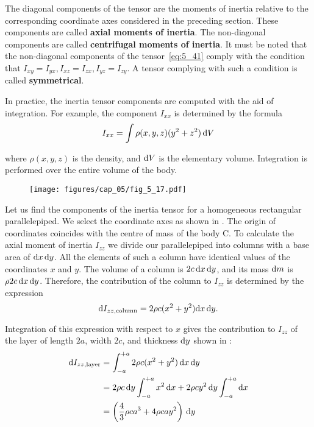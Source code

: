 \noindent
The diagonal components of the tensor are the moments of inertia relative to the corresponding coordinate axes considered in the preceding section. These components are called \textbf{axial moments of inertia}. The non-diagonal components are called \textbf{centrifugal moments of inertia}. It must be noted that the non-diagonal components of the tensor~\eqref{eq:5_41} comply with the condition that $I_{xy}=I_{yx}, I_{xz}=I_{zx}, I_{yz}=I_{zy}$. A tensor complying with such a condition is called \textbf{symmetrical}.

In practice, the inertia tensor components are computed with the aid of integration. For example, the component $I_{xx}$ is determined by the formula
\begin{equation*}
	I_{xx} = \int \rho(x,y,z)(y^2+z^2)\,\mathrm{d} V
\end{equation*}

\noindent
where $\rho(x,y,z)$ is the density, and $\mathrm{d} V$ is the elementary volume. Integration is performed over the entire volume of the body.

\begin{figure}[t]
	\begin{center}
		\texttt{[image: figures/cap\_05/fig\_5\_17.pdf]}
		\caption[]{}
		\label{fig:5_17}
	\end{center}
\vspace{-1.0cm}
\end{figure}

Let us find the components of the inertia tensor for a homogeneous rectangular parallelepiped. We select the coordinate axes as shown in . The origin of coordinates coincides with the centre of mass of the body C. To calculate the axial moment of inertia $I_{zz}$ we divide our parallelepiped into columns with a base area of $\mathrm{d} x\,\mathrm{d} y$. All the elements of such a column have identical values of the coordinates $x$ and $y$. The volume of a column is $2c\,\mathrm{d} x\,\mathrm{d} y$, and its mass $\mathrm{d} m$ is $\rho 2c\,\mathrm{d} x\,\mathrm{d} y$. Therefore, the contribution of the column to $I_{zz}$ is determined by the expression
\begin{equation*}
\mathrm{d} I_{zz,\text{column}} = 2\rho c(x^2+y^2)\mathrm{d} x\,\mathrm{d} y.
\end{equation*}

\noindent
Integration of this expression with respect to $x$ gives the contribution to $I_{zz}$ of the layer of length $2a$, width $2c$, and thickness $\mathrm{d} y$ shown in :
\begin{align}
\mathrm{d} I_{zz,\text{layer}} &= \int_{-a}^{+a} 2\rho c(x^2+y^2)\,\mathrm{d} x\,\mathrm{d} y\nonumber\\
&= 2\rho c\,\mathrm{d} y\int_{-a}^{+a} x^2\,\mathrm{d} x + 2\rho cy^2\,\mathrm{d} y\int_{-a}^{+a}\mathrm{d} x \nonumber\\
&= \left(\frac{4}{3}\rho ca^3 + 4\rho cay^2\right)\,\mathrm{d} y\label{eq:5_42}
\end{align}

